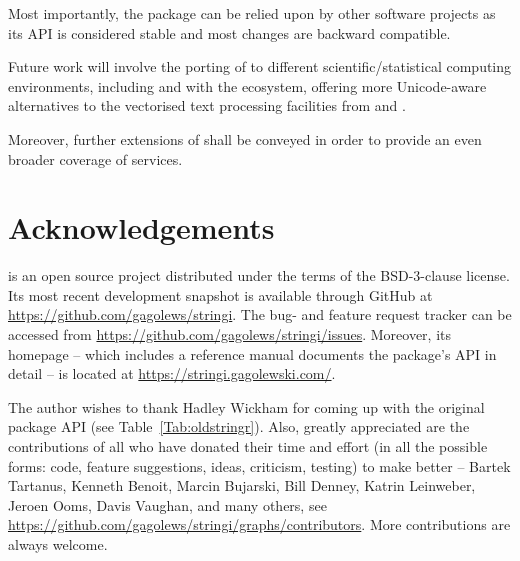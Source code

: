 \documentclass[nojss]{jss}\usepackage[]{graphicx}\usepackage[]{xcolor}
\begin{document}
Most importantly, the package can be relied upon by other software projects
as its API is considered stable and most changes are backward compatible.

Future work will involve the porting of  to different
scientific/statistical computing environments, including
 and 
with the  \citep{numpy} ecosystem,
offering more Unicode-aware alternatives to the vectorised text processing
facilities from  and  \citep[Chap.~7]{pandas}.

Moreover, further extensions of  shall be conveyed
in order to provide an even broader coverage of  services.






\section*{Acknowledgements}

 is an open source project
distributed under the terms of the BSD-3-clause license.
Its most recent development snapshot is available through GitHub at
\url{https://github.com/gagolews/stringi}. The bug- and feature request
tracker can be accessed from
\url{https://github.com/gagolews/stringi/issues}.
Moreover, its homepage -- which includes a reference manual
documents the package's API in detail --
is located at \url{https://stringi.gagolewski.com/}.

The author wishes to thank Hadley Wickham for coming
up with the original  package API (see Table~\ref{Tab:oldstringr}).
Also, greatly appreciated are the contributions of all who have donated their
time and effort (in all the possible forms: code, feature suggestions,
ideas, criticism, testing) to make  better --
Bartek Tartanus,
Kenneth Benoit,
Marcin Bujarski,
Bill Denney,
Katrin Leinweber,
Jeroen Ooms,
Davis Vaughan,
and many others,
see \url{https://github.com/gagolews/stringi/graphs/contributors}.
More contributions are always welcome.







\end{document}
